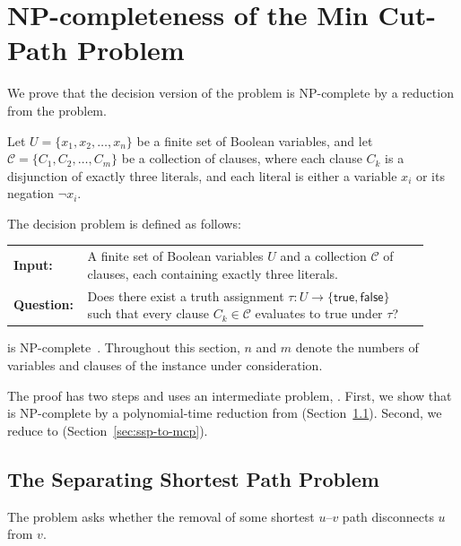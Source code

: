 \section{NP-completeness of the Min Cut-Path Problem}
\label{sec:np-completeness}
We prove that the decision version of the \MinCutPath{} problem is NP-complete by a reduction from the \ThreeSAT{} problem.

\begin{problem}[\ThreeSAT]
Let $U = \{x_1, x_2, \dots, x_n\}$ be a finite set of Boolean variables, and let
$\mathcal{C} = \{C_1, C_2, \dots, C_m\}$ be a collection of clauses, where each clause
$C_k$ is a disjunction of exactly three literals, and each literal is either a variable $x_i$ or its negation $\neg x_i$.

The \ThreeSAT{} decision problem is defined as follows:

\begin{center}
\begin{tabular}{p{0.12\linewidth}p{0.8\linewidth}}
\textbf{Input:} & A finite set of Boolean variables $U$ and a collection $\mathcal{C}$ of clauses, each containing exactly three literals.\\
\textbf{Question:} & Does there exist a truth assignment $\tau: U \rightarrow \{\mathsf{true}, \mathsf{false}\}$ such that every clause $C_k \in \mathcal{C}$ evaluates to \textsf{true} under $\tau$?
\end{tabular}
\end{center}
\end{problem}

\ThreeSAT{} is NP-complete~\cite{Cook1971Complexity}.
Throughout this section, $n$ and $m$ denote the numbers of variables and clauses of the \ThreeSAT{} instance under consideration.

The proof has two steps and uses an intermediate problem, \SSP.
First, we show that \SSP{} is NP-complete by a polynomial-time reduction from \ThreeSAT{} (Section~\ref{sec:ssp}).
Second, we reduce \SSP{} to \MinCutPath{} (Section~\ref{sec:ssp-to-mcp}).

\subsection{The Separating Shortest Path Problem}\label{sec:ssp}
The \SSP{} problem asks whether the removal of some shortest $u$--$v$ path disconnects $u$ from $v$.

